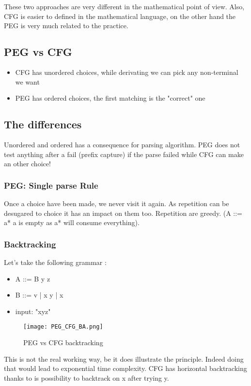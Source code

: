         These two approaches are very different in the mathematical point of view.
        Also, CFG is easier to defined in the mathematical language, on the other
        hand the PEG is very much related to the practice.
    \subsection{PEG vs CFG}
        \begin{itemize}
            \item CFG has unordered choices, while derivating we can pick any
            non-terminal we want
            \item PEG has ordered choices, the first matching is the "correct"
            one
        \end{itemize}
    \subsection{The differences}
        Unordered and ordered has a consequence for parsing algorithm. PEG does
        not test anything after a fail (prefix capture) if the parse failed
        while CFG can make an other choice!
        \subsubsection{PEG: Single parse Rule}
            Once a choice have been made, we never visit it again. As repetition
            can be desugared to choice it has an impact on them too. Repetition
            are greedy. (A ::= a* a is empty as a* will consume everything).
        \subsubsection{Backtracking}
            Let's take the following grammar : 
            \begin{itemize}
                \item A ::= B y z
                \item B ::= v | x y | x
                \item input: "xyz"
            \end{itemize}
            \begin{figure}[H]
                \centering
                \texttt{[image: PEG\_CFG\_BA.png]}
                \caption{PEG vs CFG backtracking}
                \label{fig:peg_cfg_backtrack}
            \end{figure}
            This is not the real working way, be it does illustrate the
            principle. Indeed doing that would lead to exponential time
            complexity. CFG has horizontal backtracking thanks to is possibility
            to backtrack on x after trying y.
